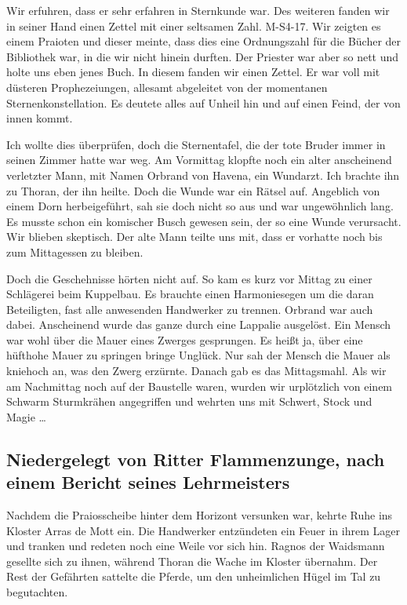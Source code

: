 Wir erfuhren, dass er sehr erfahren in Sternkunde war. Des weiteren fanden wir in seiner Hand einen Zettel mit einer seltsamen Zahl. M-S4-17. Wir zeigten es einem Praioten und dieser meinte, dass dies eine Ordnungszahl für die Bücher der Bibliothek war, in die wir nicht hinein durften. Der Priester war aber so nett und holte uns eben jenes Buch. In diesem fanden wir einen Zettel. Er war voll mit düsteren Prophezeiungen, allesamt abgeleitet von der momentanen Sternenkonstellation. Es deutete alles auf Unheil hin und auf einen Feind, der von innen kommt.


Ich wollte dies überprüfen, doch die Sternentafel, die der tote Bruder immer in seinen Zimmer hatte war weg. Am Vormittag klopfte noch ein alter anscheinend verletzter Mann, mit Namen Orbrand von Havena, ein Wundarzt. Ich brachte ihn zu Thoran, der ihn heilte. Doch die Wunde war ein Rätsel auf. Angeblich von einem Dorn herbeigeführt, sah sie doch nicht so aus und war ungewöhnlich lang. Es musste schon ein komischer Busch gewesen sein, der so eine Wunde verursacht. Wir blieben skeptisch. Der alte Mann teilte uns mit, dass er vorhatte noch bis zum Mittagessen zu bleiben. 


Doch die Geschehnisse hörten nicht auf. So kam es kurz vor Mittag zu einer Schlägerei beim Kuppelbau. Es brauchte einen Harmoniesegen um die daran Beteiligten, fast alle anwesenden Handwerker zu trennen. Orbrand war auch dabei. Anscheinend wurde das ganze durch eine Lappalie ausgelöst. Ein Mensch war wohl über die Mauer eines Zwerges gesprungen. Es heißt ja, über eine hüfthohe Mauer zu springen bringe Unglück. Nur sah der Mensch die Mauer als kniehoch an, was den Zwerg erzürnte. Danach gab es das Mittagsmahl. Als wir am Nachmittag noch auf der Baustelle waren, wurden wir urplötzlich von einem Schwarm Sturmkrähen angegriffen und wehrten uns mit Schwert, Stock und Magie \dots

\subsection{Niedergelegt von Ritter Flammenzunge, nach einem Bericht seines Lehrmeisters}

Nachdem die Praiosscheibe hinter dem Horizont versunken war, kehrte Ruhe ins Kloster Arras de Mott ein. Die Handwerker entzündeten ein Feuer in ihrem Lager und tranken und redeten noch eine Weile vor sich hin. Ragnos der Waidsmann gesellte sich zu ihnen, während Thoran die Wache im Kloster übernahm. Der Rest der Gefährten sattelte die Pferde, um den unheimlichen Hügel im Tal zu begutachten.

